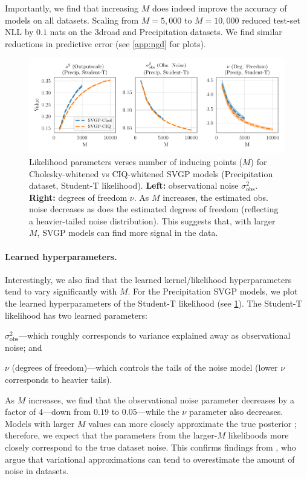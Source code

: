 Importantly, we find that increasing $M$ does indeed improve the accuracy of models on all datasets.
Scaling from $M=5,\!000$ to $M=10,\!000$ reduced test-set NLL by $0.1$ nats on the 3droad and Precipitation datasets.
We find similar reductions in predictive error (see \cref{app:ngd} for plots).

\begin{figure}[t!]
  \centering
  \includegraphics[width=0.7\linewidth]{figures/variational_stats.pdf}
  \caption[Likelihood parameters verses number of inducing points ($M$) for Cholesky-whitened vs CIQ-whitened SVGP models.]{
    Likelihood parameters verses number of inducing points ($M$) for Cholesky-whitened vs CIQ-whitened SVGP models (Precipitation dataset, Student-T likelihood).
    {\bf Left:} observational noise $\sigma^2_\text{obs}$.
    {\bf Right:} degrees of freedom $\nu$.
    As $M$ increases, the estimated obs. noise decreases as does the estimated degrees of freedom (reflecting a heavier-tailed noise distribution).
    This suggests that, with larger $M$, SVGP models can find more signal in the data.
  }
  \label{fig:variational_stats}
\end{figure}

\paragraph{Learned hyperparameters.}
Interestingly, we also find that the learned kernel/likelihood hyperparameters tend to vary significantly with $M$.
For the Precipitation SVGP models, we plot the learned hyperparameters of the Student-T likelihood (see \cref{fig:variational_stats}).
The Student-T likelihood has two learned parameters:
%
\begin{enumerate*}
  \item $\sigma^2_\text{obs}$---which roughly corresponds to variance explained away as observational noise; and
  \item $\nu$ (degrees of freedom)---which controls the tails of the noise model (lower $\nu$ corresponds to heavier tails).
\end{enumerate*}
%
As $M$ increases, we find that the observational noise parameter decreases by a factor of $4$---down from $0.19$ to $0.05$---while the $\nu$ parameter also decreases.
Models with larger $M$ values can more closely approximate the true posterior \cite{hensman2013gaussian}; therefore, we expect that the parameters from the larger-$M$ likelihoods more closely correspond to the true dataset noise.
This confirms findings from \citet{bauer2016understanding}, who argue that variational approximations can tend to overestimate the amount of noise in datasets.
